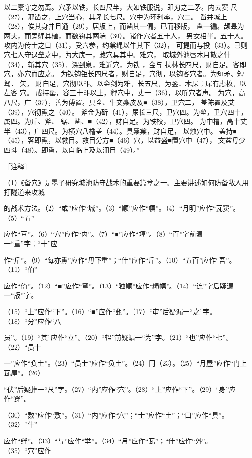 \documentclass[12pt,UTF8]{ctexbook}
\begin{document}
以二橐守之勿离。穴矛以铁，长四尺半，大如铁服说，即刃之二矛。内去窦 
尺（27），邪凿之，上穴当心，其矛长七尺。穴中为环利率，穴二。 
凿井城上（28），俟其身井且通（29），居版上，而凿其一偏，已而移版， 
凿一徧。颉皋为两夫，而旁貍其植，而数钩其两端（30）。诸作穴者五十人， 
男女相半。五十人。攻内为传士之口（31），受六参，约枲绳以牛其下（32）， 
可提而与投（33）。已则穴七人守退垒之中，为大庑一，藏穴具其中。难穴， 
取城外池唇木月散之什（34），斩其穴（35），深到泉，难近穴，为铁 ，金与 
扶林长四尺，财自足。客即穴，亦穴而应之。 
为铁钩钜长四尺者，财自足，穴彻，以钩客穴者。为短矛、短驽、 矢， 
财自足，穴彻以斗。以金剑为难，长五尺，为銎、木杘；杘有虑枚，以左客 
穴。 
戒持罂，容三十斗以上，貍穴中，丈一（36），以听穴者声。 
为穴，高八尺，广（37），善为傅置。具全、牛交槀皮及■（38），卫穴二， 
盖陈靃及艾（39），穴彻熏之（40）。 
斧金为斫（41），杘长三尺，卫穴四。为垒，卫穴四十，属四。为斤、斧、 
锯、凿、■（42），财自足。为铁校，卫穴四。 
为中橹，高十丈半（43），广四尺。为横穴八橹盖（44）。具槀枲，财自足， 
以烛穴中。 
盖持■（45），客即熏，以救目。救目分方■（46）穴，以益盛■置穴中（47）， 
文盆毋少四斗（48）。即熏，以自临上及以沺目（49）。” 


［注释］ 

（1）《备穴》是墨子研究城池防守战术的重要篇章之一。主要讲述如何防备敌人用打隧道来攻城 

的战术方法。（2）“或”应作“城”。（3）“顺”应作“幎”。（4）“月明”应作“瓦窦”。（5）“五” 

应作“亘”。（6）“穴”应作“内”。（7）“■”应作“埻”。（8）“百”字前漏一“重”字；“十”应 

作“斤”。（9）“每亦熏”应作“毋下重”；“什”应作“斤”。（10）“五百”应作“吾”。（11）“伯” 

应作“倚”。（12）“■”应作“窜”。（13）“独顺”应作“绳幎”。（14）“连”字后疑漏一“版”字。 

（15）“上”应作“下”。（16）“■”应作“甀”。（17）“审”后疑漏一“之”字。（18）“分”应作“八 

员”。（19）“其”应作“立”。（20）“辒”前疑漏一“为”字。（21）“也”应作“七”。（22）“员十 

一”应作“负土”。（23）“员士”应作“负土”。（24）同（23）。（25）“月屋”应作“门上瓦屋”。（26） 

“伏”后疑掉一“尺”字。（27）“内”应作“穴”。（28）“上”应作“下”。（29）“身”应作“穿”。 

（30）“数”应作“敷”。（31）“内”应作“穴”；“士”应作“土”；“口”应作“具”。（32）“牛” 

应作“绊”。（33）“与”应作“举”。（34）“月”应作“瓦”；“什”应作“外”。（35）“穴”应作 
\end{document}
